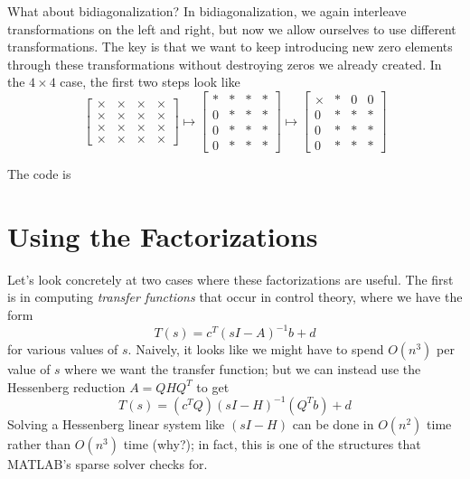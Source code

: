 \documentclass[12pt, leqno]{article} %
\begin{document}
What about bidiagonalization?  In bidiagonalization, we again
interleave transformations on the left and right, but now we allow
ourselves to use different transformations.  The key is that we
want to keep introducing new zero elements through these
transformations without destroying zeros we already created.
In the $4 \times 4$ case, the first two steps look like
\[
\begin{bmatrix}
  \times & \times & \times & \times \\
  \times & \times & \times & \times \\
  \times & \times & \times & \times \\
  \times & \times & \times & \times
\end{bmatrix} \mapsto
\begin{bmatrix}
  * & * & * & * \\
  0 & * & * & * \\
  0 & * & * & * \\
  0 & * & * & *
\end{bmatrix} \mapsto
\begin{bmatrix}
  \times & * & 0 & 0 \\
  0 & * & * & * \\
  0 & * & * & * \\
  0 & * & * & *
\end{bmatrix}
\]

The code is


\section{Using the Factorizations}

Let's look concretely at two cases where these factorizations are
useful.  The first is in computing {\em transfer functions}
that occur in control theory, where we have the form
\[
  T(s) = c^T (sI-A)^{-1} b + d
\]
for various values of $s$.  Naively, it looks like we might have
to spend $O(n^3)$ per value of $s$ where we want the transfer
function; but we can instead use the Hessenberg reduction
$A = Q H Q^T$ to get
\[
  T(s) = (c^T Q) (sI-H)^{-1} (Q^T b) + d
\]
Solving a Hessenberg linear system like $(sI-H)$ can be done in
$O(n^2)$ time rather than $O(n^3)$ time (why?); in fact, this is one
of the structures that MATLAB's sparse solver checks for.
\end{document}

